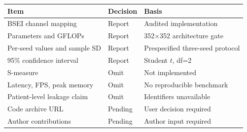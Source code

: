 \begin{tabular}{lll}
\hline
Item & Decision & Basis \\
\hline
BSEI channel mapping & Report & Audited implementation \\
Parameters and GFLOPs & Report & 352$\times$352 architecture gate \\
Per-seed values and sample SD & Report & Prespecified three-seed protocol \\
95\% confidence interval & Report & Student $t$, df=2 \\
S-measure & Omit & Not implemented \\
Latency, FPS, peak memory & Omit & No reproducible benchmark \\
Patient-level leakage claim & Omit & Identifiers unavailable \\
Code archive URL & Pending & User decision required \\
Author contributions & Pending & Author input required \\
\hline
\end{tabular}
